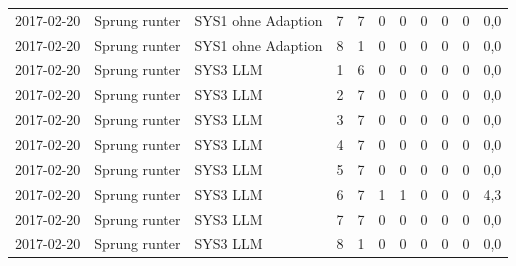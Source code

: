 \begin{tabular}{lllrrrrrrrr}
2017-02-20 & Sprung runter & SYS1 ohne Adaption & 7 & 7 & 0 & 0 & 0 & 0 & 0 & 0,0 \\
2017-02-20 & Sprung runter & SYS1 ohne Adaption & 8 & 1 & 0 & 0 & 0 & 0 & 0 & 0,0 \\
2017-02-20 & Sprung runter & SYS3 LLM & 1 & 6 & 0 & 0 & 0 & 0 & 0 & 0,0 \\
2017-02-20 & Sprung runter & SYS3 LLM & 2 & 7 & 0 & 0 & 0 & 0 & 0 & 0,0 \\
2017-02-20 & Sprung runter & SYS3 LLM & 3 & 7 & 0 & 0 & 0 & 0 & 0 & 0,0 \\
2017-02-20 & Sprung runter & SYS3 LLM & 4 & 7 & 0 & 0 & 0 & 0 & 0 & 0,0 \\
2017-02-20 & Sprung runter & SYS3 LLM & 5 & 7 & 0 & 0 & 0 & 0 & 0 & 0,0 \\
2017-02-20 & Sprung runter & SYS3 LLM & 6 & 7 & 1 & 1 & 0 & 0 & 0 & 4,3 \\
2017-02-20 & Sprung runter & SYS3 LLM & 7 & 7 & 0 & 0 & 0 & 0 & 0 & 0,0 \\
2017-02-20 & Sprung runter & SYS3 LLM & 8 & 1 & 0 & 0 & 0 & 0 & 0 & 0,0 \\
\bottomrule
\end{tabular}
